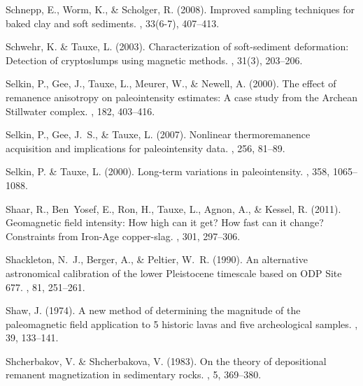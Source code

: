 \documentclass[11pt]{book}
\begin{document}
\begin{thebibliography}{}
Schnepp, E., Worm, K., \& Scholger, R. (2008).
\newblock Improved sampling techniques for baked clay and soft sediments.
, 33(6-7), 407--413.

Schwehr, K. \& Tauxe, L. (2003).
\newblock Characterization of soft-sediment deformation: Detection of
  cryptoslumps using magnetic methods.
, 31(3), 203--206.

Selkin, P., Gee, J., Tauxe, L., Meurer, W., \& Newell, A. (2000).
\newblock The effect of remanence anisotropy on paleointensity estimates: A
  case study from the Archean Stillwater complex.
, 182, 403--416.

Selkin, P., Gee, J.~S., \& Tauxe, L. (2007).
\newblock Nonlinear thermoremanence acquisition and implications for
  paleointensity data.
, 256, 81--89.

Selkin, P. \& Tauxe, L. (2000).
\newblock Long-term variations in paleointensity.
, 358, 1065--1088.

Shaar, R., Ben~Yosef, E., Ron, H., Tauxe, L., Agnon, A., \& Kessel, R. (2011).
\newblock Geomagnetic field intensity: How high can it get? How fast can it
  change? Constraints from Iron-Age copper-slag.
, 301, 297--306.

Shackleton, N.~J., Berger, A., \& Peltier, W.~R. (1990).
\newblock An alternative astronomical calibration of the lower Pleistocene
  timescale based on {ODP} Site 677.
, 81, 251--261.

Shaw, J. (1974).
\newblock A new method of determining the magnitude of the paleomagnetic field
  application to 5 historic lavas and five archeological samples.
, 39, 133--141.

Shcherbakov, V. \& Shcherbakova, V. (1983).
\newblock On the theory of depositional remanent magnetization in sedimentary
  rocks.
, 5, 369--380.


\end{thebibliography}
\end{document}
